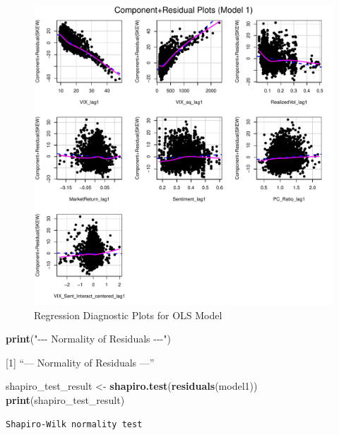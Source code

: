 \documentclass[
]{article}
\newenvironment{Shaded}{\begin{snugshade}}{\end{snugshade}}
\newcommand{\FunctionTok}[1]{\textcolor[rgb]{0.13,0.29,0.53}{\textbf{#1}}}
\newcommand{\NormalTok}[1]{#1}
\newcommand{\OtherTok}[1]{\textcolor[rgb]{0.56,0.35,0.01}{#1}}
\newcommand{\StringTok}[1]{\textcolor[rgb]{0.31,0.60,0.02}{#1}}
\begin{document}
\begin{figure}
\centering
\includegraphics{FinalProject_files/figure-latex/model1-diagnostics-2.pdf}
\caption{Regression Diagnostic Plots for OLS Model}
\end{figure}

\begin{Shaded}
\begin{Highlighting}[]
  \FunctionTok{print}\NormalTok{(}\StringTok{"{-}{-}{-} Normality of Residuals {-}{-}{-}"}\NormalTok{)}
\end{Highlighting}
\end{Shaded}

{[}1{]} ``--- Normality of Residuals ---''

\begin{Shaded}
\begin{Highlighting}[]
\NormalTok{  shapiro\_test\_result }\OtherTok{\textless{}{-}} \FunctionTok{shapiro.test}\NormalTok{(}\FunctionTok{residuals}\NormalTok{(model1))}
  \FunctionTok{print}\NormalTok{(shapiro\_test\_result)}
\end{Highlighting}
\end{Shaded}

\begin{verbatim}
Shapiro-Wilk normality test
\end{verbatim}
\end{document}
